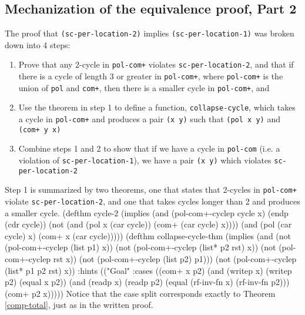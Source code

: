 \documentclass[]{eptcs}
\newenvironment{qv}
{\quote\Verbatim}
{\endVerbatim\endquote}
\begin{document}
\subsection{Mechanization of the equivalence proof, Part 2}
The proof that \verb|(sc-per-location-2)| implies \verb|(sc-per-location-1)| was broken down into 4 steps:
\begin{enumerate}
  \item Prove that any 2-cycle in \verb|pol-com+| violates \verb|sc-per-location-2|, and that if there is a cycle of length 3 or greater in \verb|pol-com+|, where \verb|pol-com+| is the union of \verb|pol| and \verb|com+|, then there is a smaller cycle in \verb|pol-com+|, and   \item Use the theorem in step 1 to define a function, \verb|collapse-cycle|, which takes a cycle in \verb|pol-com+| and produces a pair \verb|(x y)| such that \verb|(pol x y)| and \verb|(com+ y x)|
  \item Combine steps 1 and 2 to show that if we have a cycle in \verb|pol-com| (i.e. a violation of \linebreak\verb|sc-per-location-1|), we have a pair \verb|(x y)| which violates \verb|sc-per-location-2|
\end{enumerate}

Step 1 is summarized by two theorems, one that states that 2-cycles in \verb|pol-com+| violate \linebreak\verb|sc-per-location-2|, and one that takes cycles longer than 2 and produces a smaller cycle.
\begin{qv}
(defthm cycle-2
  (implies (and (pol-com+-cyclep cycle x) 
                (endp (cdr cycle))
                (not (and (pol x (car cycle))
                          (com+ (car cycle) x))))
           (and (pol (car cycle) x)
                (com+ x (car cycle)))))
(defthm collapse-cycle-thm
  (implies (and (not (pol-com+-cyclep (list p1) x))
                (not (pol-com+-cyclep (list* p2 rst) x))
                (not (pol-com+-cyclep rst x))
                (not (pol-com+-cyclep (list p2) p1)))
           (not (pol-com+-cyclep (list* p1 p2 rst) x))
  :hints (("Goal"
           :cases ((com+ x p2)
                   (and (writep x)
                        (writep p2)
                        (equal x p2))
                   (and (readp x) 
                        (readp p2)
                        (equal (rf-inv-fn x) (rf-inv-fn p2)))
                   (com+ p2 x)))))
\end{qv}
Notice that the case split corresponds exactly to Theorem \ref{comp-total}, just as in the written proof.
\end{document}
